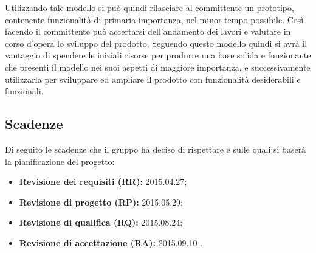 Utilizzando tale modello si può quindi rilasciare al committente un \gls{prototipo}, contenente funzionalità di primaria importanza, nel minor tempo possibile. Così facendo il committente può accertarsi dell'andamento dei lavori e valutare in corso d'opera lo sviluppo del prodotto. Seguendo questo modello quindi si avrà il vantaggio di spendere le iniziali risorse per produrre una base solida e funzionante che presenti il modello nei suoi aspetti di maggiore importanza, e successivamente utilizzarla per sviluppare ed ampliare il prodotto con funzionalità desiderabili e funzionali.
 
\subsection{Scadenze}
Di seguito le scadenze che il gruppo \GRUPPO{} ha deciso di rispettare e sulle quali si baserà la pianificazione del progetto:
\begin{itemize}
	\item \textbf{Revisione dei requisiti (RR):} 2015.04.27;
	\item \textbf{Revisione di progetto (RP):} 2015.05.29;
	\item \textbf{Revisione di qualifica (RQ):} 2015.08.24;
	\item \textbf{Revisione di accettazione (RA):} 2015.09.10 .
\end{itemize}





